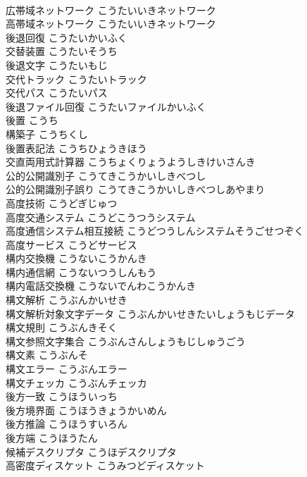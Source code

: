 \documentclass[8pt]{extreport}
\begin{document}
\begin{CJK}{UTF8}{min}
\\	広帯域ネットワーク	こうたいいきネットワーク	
\\	高帯域ネットワーク	こうたいいきネットワーク	
\\	後退回復	こうたいかいふく	
\\	交替装置	こうたいそうち	
\\	後退文字	こうたいもじ	
\\	交代トラック	こうたいトラック	
\\	交代パス	こうたいパス	
\\	後退ファイル回復	こうたいファイルかいふく	
\\	後置	こうち	
\\	構築子	こうちくし	
\\	後置表記法	こうちひょうきほう	
\\	交直両用式計算器	こうちょくりょうようしきけいさんき	
\\	公的公開識別子	こうてきこうかいしきべつし	
\\	公的公開識別子誤り	こうてきこうかいしきべつしあやまり	
\\	高度技術	こうどぎじゅつ	
\\	高度交通システム	こうどこうつうシステム	
\\	高度通信システム相互接続	こうどつうしんシステムそうごせつぞく	
\\	高度サービス	こうどサービス	
\\	構内交換機	こうないこうかんき	
\\	構内通信網	こうないつうしんもう	
\\	構内電話交換機	こうないでんわこうかんき	
\\	構文解析	こうぶんかいせき	
\\	構文解析対象文字データ	こうぶんかいせきたいしょうもじデータ	
\\	構文規則	こうぶんきそく	
\\	構文参照文字集合	こうぶんさんしょうもじしゅうごう	
\\	構文素	こうぶんそ	
\\	構文エラー	こうぶんエラー	
\\	構文チェッカ	こうぶんチェッカ	
\\	後方一致	こうほういっち	
\\	後方境界面	こうほうきょうかいめん	
\\	後方推論	こうほうすいろん	
\\	後方端	こうほうたん	
\\	候補デスクリプタ	こうほデスクリプタ	
\\	高密度ディスケット	こうみつどディスケット	

\end{CJK}
\end{document}
